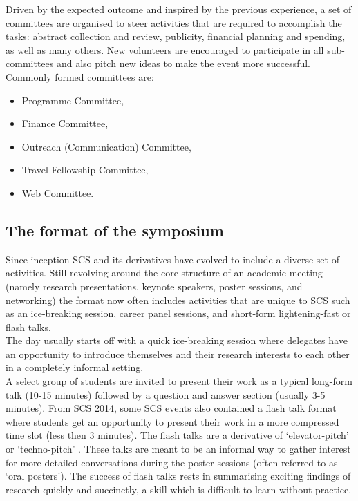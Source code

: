 \documentclass[]{article}%
\begin{document}
	Driven by the expected outcome and inspired by the previous experience, a set of committees are organised to steer activities that are required to accomplish the tasks: abstract collection and review, publicity, financial planning and spending, as well as many others. New volunteers are encouraged to participate in all sub-committees and also pitch new ideas to make the event more successful.\\ 
	
	Commonly formed committees are: 
	\begin{itemize}
		\item  Programme Committee, 
		\item  Finance Committee, 
		\item  Outreach (Communication) Committee, 
		\item  Travel Fellowship Committee, 
		\item  Web Committee.
	\end{itemize}
	
	\subsection*{The format of the symposium}
	
	Since inception SCS and its derivatives have evolved to include a diverse set of activities. Still revolving around the core structure of an academic meeting (namely research presentations, keynote speakers, poster sessions, and networking) the format now often includes activities that are unique to SCS such as an ice-breaking session, career panel sessions, and short-form lightening-fast or flash talks.\\
	
	The day usually starts off with a quick ice-breaking session where delegates have an opportunity to introduce themselves and their research interests to each other in a completely informal setting.\\ 
	
	A select group of students are invited to present their work as a typical long-form talk (10-15 minutes) followed by a question and answer section (usually 3-5 minutes). From SCS 2014, some SCS events also contained a flash talk format where students get an opportunity to present their work in a more compressed time slot (less then 3 minutes). The flash talks are a derivative of `elevator-pitch' or `techno-pitch' \citep{techno-pitch}. These talks are meant to be an informal way to gather interest for more detailed conversations during the poster sessions (often referred to as `oral posters'). The success of flash talks rests in summarising exciting findings of research quickly and succinctly, a skill which is difficult to learn without practice.\\
	
\end{document}
